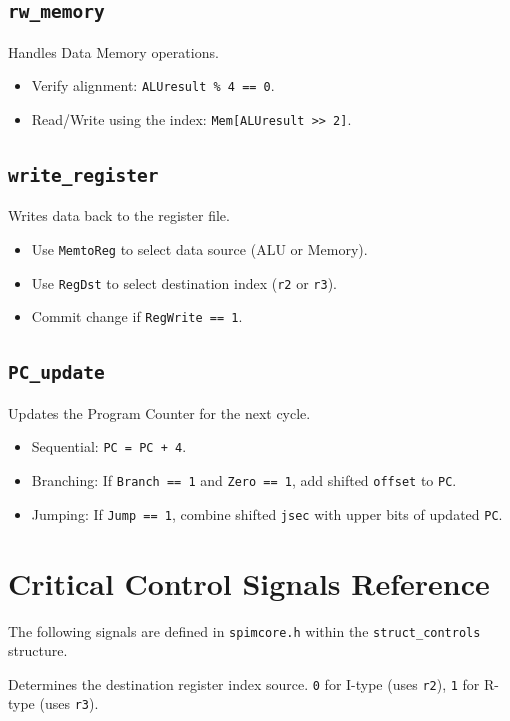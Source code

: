 \subsection{\texttt{rw\_memory}}
Handles Data Memory operations.
\begin{itemize}
    \item Verify alignment: \texttt{ALUresult \% 4 == 0}.
    \item Read/Write using the index: \texttt{Mem[ALUresult >> 2]}.
\end{itemize}

\subsection{\texttt{write\_register}}
Writes data back to the register file.
\begin{itemize}
    \item Use \texttt{MemtoReg} to select data source (ALU or Memory).
    \item Use \texttt{RegDst} to select destination index (\texttt{r2} or \texttt{r3}).
    \item Commit change if \texttt{RegWrite == 1}.
\end{itemize}

\subsection{\texttt{PC\_update}}
Updates the Program Counter for the next cycle.
\begin{itemize}
    \item Sequential: \texttt{PC = PC + 4}.
    \item Branching: If \texttt{Branch == 1} and \texttt{Zero == 1}, add shifted \texttt{offset} to \texttt{PC}.
    \item Jumping: If \texttt{Jump == 1}, combine shifted \texttt{jsec} with upper bits of updated \texttt{PC}.
\end{itemize}

\section{Critical Control Signals Reference}

The following signals are defined in \texttt{spimcore.h} within the \texttt{struct\_controls} structure.

\begin{vocabulary}[RegDst]
Determines the destination register index source. \texttt{0} for I-type (uses \texttt{r2}), \texttt{1} for R-type (uses \texttt{r3}).
\end{vocabulary}

